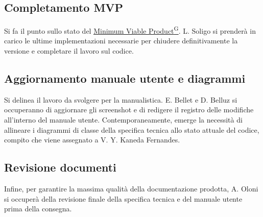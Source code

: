 \documentclass[a4paper,12pt]{article}
\providecommand{\glslink}[2]{\href{https://alittlebyte-19.github.io/Documentazione/glossario.html\#gls-#1}{\underline{#2}\textsuperscript{\scriptsize G}}}
\begin{document}
\subsection{Completamento MVP}
Si fa il punto sullo stato del \glslink{mvp-minimum-viable-product}{Minimum Viable Product}. L. Soligo si prenderà in carico le ultime implementazioni necessarie per chiudere definitivamente la versione e completare il lavoro sul codice.

\subsection{Aggiornamento manuale utente e diagrammi}
Si delinea il lavoro da svolgere per la manualistica. E. Bellet e D. Belluz si occuperanno di aggiornare gli screenshot e di redigere il registro delle modifiche all'interno del manuale utente.
Contemporaneamente, emerge la necessità di allineare i diagrammi di classe della specifica tecnica allo stato attuale del codice, compito che viene assegnato a V. Y. Kaneda Fernandes.

\subsection{Revisione documenti}
Infine, per garantire la massima qualità della documentazione prodotta, A. Oloni si occuperà della revisione finale della specifica tecnica e del manuale utente prima della consegna.
\end{document}
